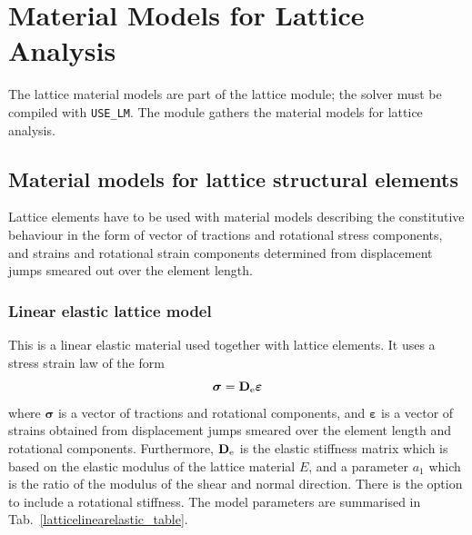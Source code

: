 \documentclass[a4paper]{article}
\begin{document}
\section{Material Models for Lattice Analysis}
The lattice material models are part of the lattice module; the solver must be compiled with \texttt{USE\_LM}. The module gathers the material models for lattice analysis.

\subsection{Material models for lattice structural elements}

Lattice elements have to be used with material models describing the constitutive behaviour in the form of vector of tractions and rotational stress components, and strains and rotational strain components determined from displacement jumps smeared out over the element length.

\subsubsection{Linear elastic lattice model}
This is a linear elastic material used together with lattice elements.
It uses a stress strain law of the form
\begin{equation}
\boldsymbol{\sigma} = \mathbf{D}_{\rm e} \boldsymbol{\varepsilon}
\end{equation}
where $\boldsymbol{\sigma}$ is a vector of tractions and rotational components, and $\boldsymbol{\varepsilon}$ is a vector of strains obtained from displacement jumps smeared over the element length and rotational components.
Furthermore, $\mathbf{D}_{\rm e}$ is the elastic stiffness matrix which is based on the elastic modulus of the lattice material $E$, and a parameter $a_1$ which is the ratio of the modulus of the shear and normal direction. There is the option to include a rotational stiffness. The model parameters are summarised in Tab.~\ref{latticelinearelastic_table}.
\end{document}
